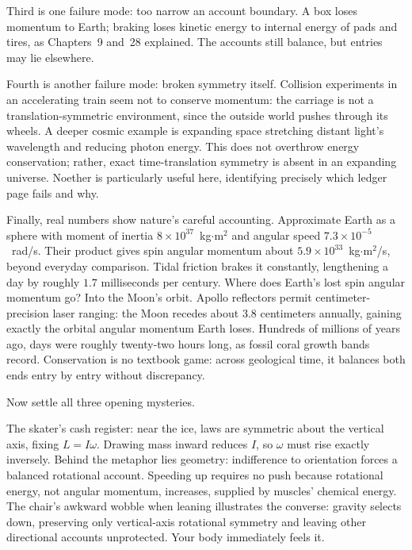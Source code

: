 Third is one failure mode: too narrow an account boundary. A box loses momentum to Earth; braking loses kinetic energy to internal energy of pads and tires, as Chapters~9 and~28 explained. The accounts still balance, but entries may lie elsewhere.

Fourth is another failure mode: broken symmetry itself. Collision experiments in an accelerating train seem not to conserve momentum: the carriage is not a translation-symmetric environment, since the outside world pushes through its wheels. A deeper cosmic example is expanding space stretching distant light's wavelength and reducing photon energy. This does not overthrow energy conservation; rather, exact time-translation symmetry is absent in an expanding universe. Noether is particularly useful here, identifying precisely which ledger page fails and why.

Finally, real numbers show nature's careful accounting. Approximate Earth as a sphere with moment of inertia \(8\times10^{37}\)~kg\(\cdot\)m\(^2\) and angular speed \(7.3\times10^{-5}\)~rad/s. Their product gives spin angular momentum about \(5.9\times10^{33}\)~kg\(\cdot\)m\(^2\)/s, beyond everyday comparison. Tidal friction brakes it constantly, lengthening a day by roughly \(1.7\) milliseconds per century. Where does Earth's lost spin angular momentum go? Into the Moon's orbit. Apollo reflectors permit centimeter-precision laser ranging: the Moon recedes about \(3.8\) centimeters annually, gaining exactly the orbital angular momentum Earth loses. Hundreds of millions of years ago, days were roughly twenty-two hours long, as fossil coral growth bands record. Conservation is no textbook game: across geological time, it balances both ends entry by entry without discrepancy.


Now settle all three opening mysteries.

The skater's cash register: near the ice, laws are symmetric about the vertical axis, fixing \(L=I\omega\). Drawing mass inward reduces \(I\), so \(\omega\) must rise exactly inversely. Behind the metaphor lies geometry: indifference to orientation forces a balanced rotational account. Speeding up requires no push because rotational energy, not angular momentum, increases, supplied by muscles' chemical energy. The chair's awkward wobble when leaning illustrates the converse: gravity selects down, preserving only vertical-axis rotational symmetry and leaving other directional accounts unprotected. Your body immediately feels it.

